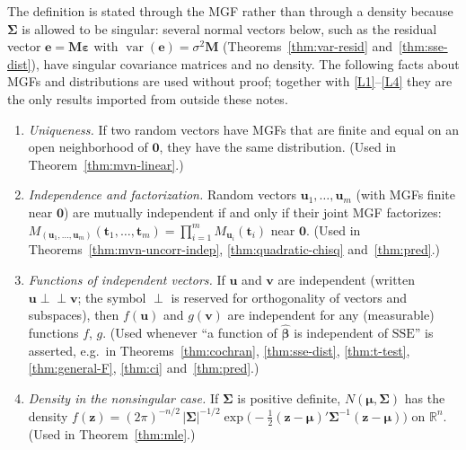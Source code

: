 \documentclass[12pt,a4paper]{article}
\theoremstyle{definition}
\DeclareMathOperator\var{var}
\newcommand{\SSE}{\mathrm{SSE}}
\def\bb{\boldsymbol{\beta}}
\newcommand{\be}{\boldsymbol{\varepsilon}}
\newcommand{\bM}{\mathbf{M}}
\newcommand{\bzero}{\mathbf{0}}
\newcommand{\bz}{\mathbf{z}}
\newcommand{\bv}{\mathbf{v}}
\newcommand{\Real}{\mathbb{R}}
\newcommand{\indep}{\perp\!\!\!\perp}
\newcommand{\bu}{\mathbf{u}}
\begin{document}
The definition is stated through the MGF rather than through a density because $\boldsymbol\Sigma$ is allowed to be singular: several normal vectors below, such as the residual vector $\mathbf{e} = \bM\be$ with $\var(\mathbf{e}) = \sigma^2\bM$ (Theorems~\ref{thm:var-resid} and~\ref{thm:sse-dist}), have singular covariance matrices and no density. The following facts about MGFs and distributions are used without proof; together with \ref{L1}--\ref{L4} they are the only results imported from outside these notes.
\begin{enumerate}[label=\textup{(N\arabic*)}]
\item\label{N1} \emph{Uniqueness.} If two random vectors have MGFs that are finite and equal on an open neighborhood of $\bzero$, they have the same distribution. (Used in Theorem~\ref{thm:mvn-linear}.)
\item\label{N2} \emph{Independence and factorization.} Random vectors $\bu_1, \ldots, \bu_m$ (with MGFs finite near $\bzero$) are mutually independent if and only if their joint MGF factorizes: $M_{(\bu_1, \ldots, \bu_m)}(\mathbf{t}_1, \ldots, \mathbf{t}_m) = \prod_{i=1}^m M_{\bu_i}(\mathbf{t}_i)$ near $\bzero$. (Used in Theorems~\ref{thm:mvn-uncorr-indep}, \ref{thm:quadratic-chisq} and~\ref{thm:pred}.)
\item\label{N3} \emph{Functions of independent vectors.} If $\bu$ and $\bv$ are independent (written $\bu \indep \bv$; the symbol $\perp$ is reserved for orthogonality of vectors and subspaces), then $f(\bu)$ and $g(\bv)$ are independent for any (measurable) functions $f$, $g$. (Used whenever ``a function of $\hat{\bb}$ is independent of $\SSE$'' is asserted, e.g.\ in Theorems~\ref{thm:cochran}, \ref{thm:sse-dist}, \ref{thm:t-test}, \ref{thm:general-F}, \ref{thm:ci} and~\ref{thm:pred}.)
\item\label{N4} \emph{Density in the nonsingular case.} If $\boldsymbol\Sigma$ is positive definite, $N(\boldsymbol\mu, \boldsymbol\Sigma)$ has the density $f(\bz) = (2\pi)^{-n/2}\,|\boldsymbol\Sigma|^{-1/2}\exp\bigl(-\tfrac{1}{2}(\bz - \boldsymbol\mu)'\boldsymbol\Sigma^{-1}(\bz - \boldsymbol\mu)\bigr)$ on $\Real^n$. (Used in Theorem~\ref{thm:mle}.)

\end{enumerate}
\end{document}
